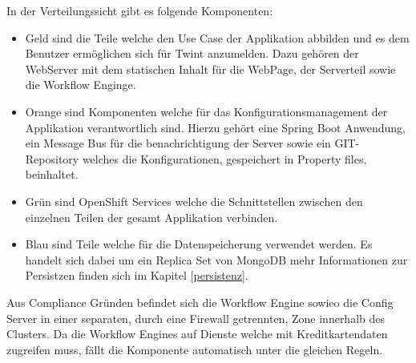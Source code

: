 In der Verteilungssicht gibt es folgende Komponenten:\newline
\begin{itemize}
	\item Geld sind die Teile welche den Use Case der Applikation abbilden und es dem Benutzer ermöglichen sich für Twint anzumelden. Dazu gehören der WebServer mit dem statischen Inhalt für die WebPage, der Serverteil sowie die Workflow Enginge.
	\item Orange sind Komponenten welche für das Konfigurationsmanagement der Applikation verantwortlich sind. Hierzu gehört eine Spring Boot Anwendung, ein Message Bus für die benachrichtigung der Server sowie ein GIT-Repository welches die Konfigurationen, gespeichert in Property files, beinhaltet.
	\item Grün sind OpenShift Services welche die Schnittstellen zwischen den einzelnen Teilen der gesamt Applikation verbinden.
	\item Blau sind Teile welche für die Datenspeicherung verwendet werden. Es handelt sich dabei um ein Replica Set von MongoDB mehr Informationen zur Persistzen finden sich im Kapitel \ref{persistenz}.
\end{itemize}

Aus Compliance Gründen befindet sich die Workflow Engine sowieo die Config Server in einer separaten, durch eine Firewall getrennten, Zone innerhalb des Clusters. Da die Workflow Engines auf Dienste welche mit Kreditkartendaten zugreifen muss, fällt die Komponente automatisch unter die gleichen Regeln. 

